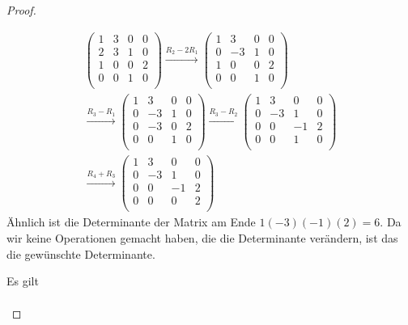 \begin{proof}
\begin{parts}
\begin{gather*}
\left(
\begin{array}{cccc}
 1 & 3 & 0 & 0 \\
 2 & 3 & 1 & 0 \\
 1 & 0 & 0 & 2 \\
 0 & 0 & 1 & 0 \\
\end{array}
\right) \xrightarrow{R_2-2R_1} \left(
\begin{array}{cccc}
 1 & 3 & 0 & 0 \\
 0 & -3 & 1 & 0 \\
 1 & 0 & 0 & 2 \\
 0 & 0 & 1 & 0 \\
\end{array}
\right) \\\xrightarrow{R_3-R_1} \left(
\begin{array}{cccc}
 1 & 3 & 0 & 0 \\
 0 & -3 & 1 & 0 \\
 0 & -3 & 0 & 2 \\
 0 & 0 & 1 & 0 \\
\end{array}
\right) \xrightarrow{R_3-R_2} \left(
\begin{array}{cccc}
 1 & 3 & 0 & 0 \\
 0 & -3 & 1 & 0 \\
 0 & 0 & -1 & 2 \\
 0 & 0 & 1 & 0 \\
\end{array}
\right) \\\xrightarrow{R_4+R_3} \left(
\begin{array}{cccc}
 1 & 3 & 0 & 0 \\
 0 & -3 & 1 & 0 \\
 0 & 0 & -1 & 2 \\
 0 & 0 & 0 & 2 \\
\end{array}
\right)	
\end{gather*}
Ähnlich ist die Determinante der Matrix am Ende $1(-3)(-1)(2)=6$. Da wir keine Operationen gemacht haben, die die Determinante verändern, ist das die gewünschte Determinante.
\item Es gilt
	\begin{align*}

\end{align*}
\end{parts}
\end{proof}
